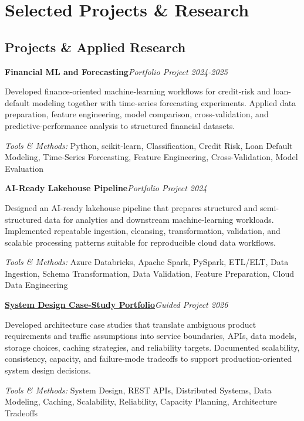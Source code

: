\documentclass[9pt,letterpaper]{extarticle}
\newcommand{\entry}[2]{\Needspace{4\baselineskip}\textbf{#1}\hfill\textit{#2}\par}
\begin{document}
\section{Selected Projects \& Research}
\subsection{Projects \& Applied Research}
\entry{Financial ML and Forecasting}{Portfolio Project \textbar{} 2024-2025}
Developed finance-oriented machine-learning workflows for credit-risk and loan-default modeling together with time-series forecasting experiments. Applied data preparation, feature engineering, model comparison, cross-validation, and predictive-performance analysis to structured financial datasets.\par
{\small\textit{Tools \& Methods:} Python, scikit-learn, Classification, Credit Risk, Loan Default Modeling, Time-Series Forecasting, Feature Engineering, Cross-Validation, Model Evaluation\par}
\vspace{1pt}
\entry{AI-Ready Lakehouse Pipeline}{Portfolio Project \textbar{} 2024}
Designed an AI-ready lakehouse pipeline that prepares structured and semi-structured data for analytics and downstream machine-learning workloads. Implemented repeatable ingestion, cleansing, transformation, validation, and scalable processing patterns suitable for reproducible cloud data workflows.\par
{\small\textit{Tools \& Methods:} Azure Databricks, Apache Spark, PySpark, ETL/ELT, Data Ingestion, Schema Transformation, Data Validation, Feature Preparation, Cloud Data Engineering\par}
\vspace{1pt}
\entry{\href{https://github.com/WaseemRaza844/system-design-masterclass}{System Design Case-Study Portfolio}}{Guided Project \textbar{} 2026}
Developed architecture case studies that translate ambiguous product requirements and traffic assumptions into service boundaries, APIs, data models, storage choices, caching strategies, and reliability targets. Documented scalability, consistency, capacity, and failure-mode tradeoffs to support production-oriented system design decisions.\par
{\small\textit{Tools \& Methods:} System Design, REST APIs, Distributed Systems, Data Modeling, Caching, Scalability, Reliability, Capacity Planning, Architecture Tradeoffs\par}
\vspace{1pt}
\end{document}
